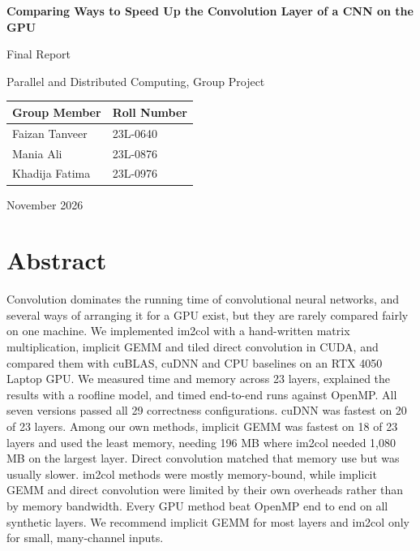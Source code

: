\documentclass[12pt,a4paper]{article}
\begin{document}
\begin{titlepage}
\centering
\vspace*{3cm}
{\LARGE\bfseries Comparing Ways to Speed Up the Convolution Layer of a CNN on the GPU\par}
\vspace{1cm}
{\large Final Report\par}
\vspace{0.4cm}
{\large Parallel and Distributed Computing, Group Project\par}
\vspace{2cm}
\begin{tabular}{ll}
\hline
\rowcolor{headgrey}\textbf{Group Member} & \textbf{Roll Number} \\ \hline
Faizan Tanveer & 23L-0640 \\
Mania Ali & 23L-0876 \\
Khadija Fatima & 23L-0976 \\
\hline
\end{tabular}
\vfill
{\large November 2026\par}
\end{titlepage}

\section*{Abstract}
Convolution dominates the running time of convolutional neural networks, and several ways of arranging it for a GPU exist, but they are rarely compared fairly on one machine. We implemented im2col with a hand-written matrix multiplication, implicit GEMM and tiled direct convolution in CUDA, and compared them with cuBLAS, cuDNN and CPU baselines on an RTX 4050 Laptop GPU. We measured time and memory across 23 layers, explained the results with a roofline model, and timed end-to-end runs against OpenMP. All seven versions passed all 29 correctness configurations. cuDNN was fastest on 20 of 23 layers. Among our own methods, implicit GEMM was fastest on 18 of 23 layers and used the least memory, needing 196 MB where im2col needed 1,080 MB on the largest layer. Direct convolution matched that memory use but was usually slower. im2col methods were mostly memory-bound, while implicit GEMM and direct convolution were limited by their own overheads rather than by memory bandwidth. Every GPU method beat OpenMP end to end on all synthetic layers. We recommend implicit GEMM for most layers and im2col only for small, many-channel inputs.

\newpage
{\setlength{\parskip}{0pt}\tableofcontents}
\newpage
\end{document}
